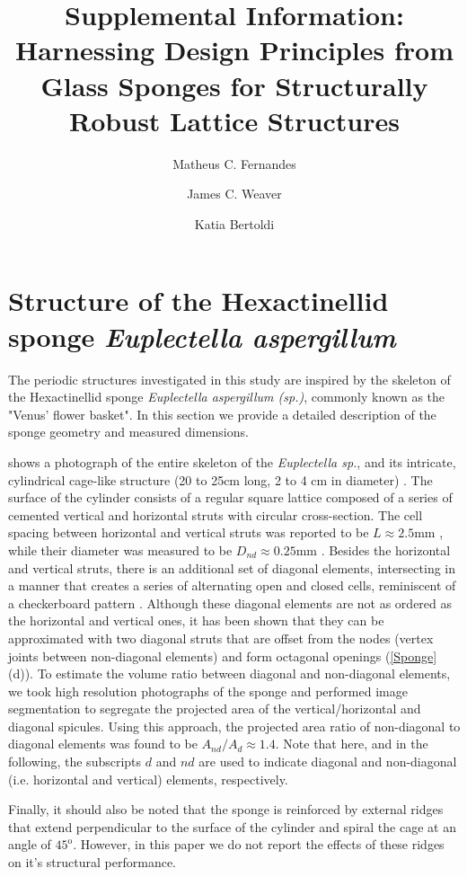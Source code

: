 \documentclass[10pt,twoside]{fernandes_supp}
\title{Supplemental Information:\\ Harnessing  Design Principles from Glass Sponges for Structurally Robust Lattice Structures}
\author[1]{Matheus C. Fernandes}
\author[2]{James C. Weaver}
\author[1,3,*]{Katia Bertoldi}
\affil[1]{John A. Paulson School of Engineering and Applied Sciences -- Harvard University, Cambridge, MA 02138}
\affil[2]{Wyss Institute -- Harvard University, Cambridge, MA 02138}
\affil[3]{Kavli Institute -- Harvard University, Cambridge, MA 02138}
\affil[*]{Corresponding author: \href{mailto:bertoldi@seas.harvard.edu}{bertoldi@seas.harvard.edu}}
\begin{document}
\maketitle
\section{Structure of the Hexactinellid sponge \textit{Euplectella aspergillum}}\label{sec:params}
The periodic structures investigated in this study are inspired by the skeleton of the Hexactinellid sponge \textit{Euplectella aspergillum (sp.)}, commonly known as the "Venus' flower basket". In this section we provide a detailed description of the sponge geometry and measured dimensions.

 shows a photograph of the entire skeleton of the \textit{Euplectella sp.}, and its intricate, cylindrical cage-like structure (20 to 25cm long, 2 to 4 cm in diameter) \citep{aizenberg2005}. The surface of the cylinder consists of a regular square lattice composed of a series of cemented vertical and horizontal struts with circular cross-section. The cell spacing between horizontal and vertical struts was reported  to be $L\approx 2.5$mm \citep{weaver2007}, while their diameter was measured to be $D_{nd}\approx 0.25$mm \citep{weaver2007}. Besides the horizontal and vertical struts, there is an additional set of diagonal elements, intersecting in a manner that creates a series of alternating open and closed cells, reminiscent of a checkerboard pattern \citep{weaver2007}. Although these diagonal elements are not as ordered as the horizontal and vertical ones, it has been shown that they can be approximated with two diagonal struts that are offset from the nodes  (vertex joints between non-diagonal elements) and form octagonal openings (\cref{Sponge}(d)). To estimate the volume ratio between diagonal and non-diagonal elements, we took high resolution photographs of the sponge and performed image segmentation to segregate the projected area of the vertical/horizontal and diagonal spicules. Using this approach, the projected area ratio of non-diagonal to diagonal elements was found to be $A_{nd}/A_{d}\approx1.4$. Note that here, and in the following, the subscripts $d$ and $nd$ are used to indicate diagonal and non-diagonal (i.e. horizontal and vertical) elements, respectively. 

Finally, it should also be noted that the sponge is reinforced by external ridges that extend perpendicular to the surface of the cylinder and spiral the cage at an angle of $45^\text{o}$. However, in this paper we do not report the effects of these ridges on it's structural performance.
\end{document}
